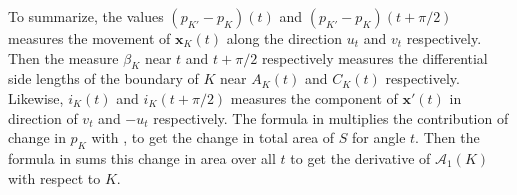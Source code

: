 To summarize, the values \((p_{K'} - p_{K})(t)\) and \((p_{K'} - p_{K})(t + \pi/2)\) measures the movement of \(\mathbf{x}_K(t)\) along the direction \(u_t\) and \(v_t\) respectively. Then the measure \(\beta_{K}\) near \(t\) and \(t + \pi/2\) respectively measures the differential side lengths of the boundary of \(K\) near \(A_K(t)\) and \(C_K(t)\) respectively. Likewise, \(i_K(t)\) and \(i_K(t + \pi/2)\) measures the component of \(\mathbf{x}'(t)\) in direction of \(v_t\) and \(-u_t\) respectively. The formula in  multiplies the contribution of change in \(p_K\) with , to get the change in total area of \(S\) for angle \(t\). Then the formula in  sums this change in area over all \(t\) to get the derivative of \(\mathcal{A}_1(K)\) with respect to \(K\).